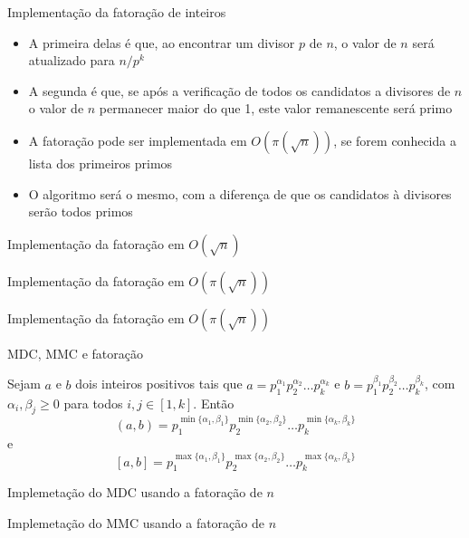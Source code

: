 \begin{frame}[fragile]{Implementação da fatoração de inteiros}

    \begin{itemize}
        \item A primeira delas é que, ao encontrar um divisor $p$ de $n$, o valor de $n$ será 
            atualizado para $n/p^k$

        \item A segunda é que, se após a verificação de todos os candidatos a divisores de $n$
            o valor de $n$ permanecer maior do que 1, este valor remanescente será primo


        \item A fatoração pode ser implementada em $O(\pi(\sqrt{n}))$, se forem conhecida a
            lista dos primeiros primos 

        \item O algoritmo será o mesmo, com a diferença de que os candidatos à divisores serão
            todos primos
    \end{itemize}

\end{frame}

\begin{frame}[fragile]{Implementação da fatoração em $O(\sqrt{n})$}
\end{frame}

\begin{frame}[fragile]{Implementação da fatoração em $O(\pi(\sqrt{n}))$}
\end{frame}

\begin{frame}[fragile]{Implementação da fatoração em $O(\pi(\sqrt{n}))$}
\end{frame}

\begin{frame}[fragile]{MDC, MMC e fatoração}

Sejam $a$ e $b$ dois inteiros positivos tais que $a = p_1^{\alpha_1}p_2^{\alpha_2}\ldots p_k^{\alpha_k}$ e $b = p_1^{\beta_1}p_2^{\beta_2}\ldots p_k^{\beta_k}$, com $\alpha_i, \beta_j \geq 0$ para todos $i, j\in [1,k]$. Então
$$
    (a, b) = p_1^{\min\{\alpha_1, \beta_1\}}p_2^{\min\{\alpha_2, \beta_2\}}\ldots p_k^{\min\{\alpha_k, \beta_k\}}
$$
e
$$
    [a, b] = p_1^{\max\{\alpha_1, \beta_1\}}p_2^{\max\{\alpha_2, \beta_2\}}\ldots p_k^{\max\{\alpha_k, \beta_k\}}
$$

\end{frame}

\begin{frame}[fragile]{Implemetação do MDC usando a fatoração de $n$}
\end{frame}

\begin{frame}[fragile]{Implemetação do MMC usando a fatoração de $n$}
\end{frame}
